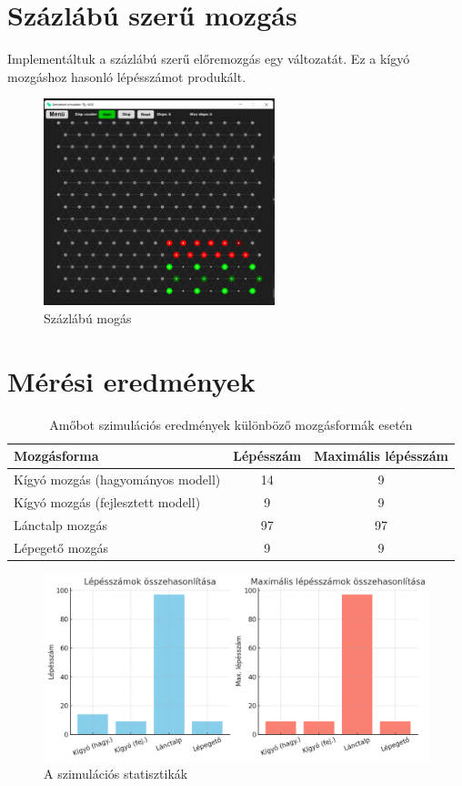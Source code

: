 \documentclass[	
  noindent
]{elteikthesis}[2024/04/26]
\begin{document}
  \section{Százlábú szerű mozgás}
    Implementáltuk a százlábú szerű előremozgás egy változatát. Ez a kígyó mozgáshoz hasonló lépésszámot produkált.
    \begin{figure}[H]
      \centering
      \includegraphics[width=0.6\textwidth]{images/mesurements/04_caterpillar.png}
      \caption{Százlábú mogás}
      \label{fig:04_caterpillar}
    \end{figure}

  \section{Mérési eredmények}
    \begin{table}[h!]
      \centering
      \begin{tabular}{|l|c|c|}
      \hline
      \textbf{Mozgásforma} & \textbf{Lépésszám} & \textbf{Maximális lépésszám} \\
      \hline
      Kígyó mozgás (hagyományos modell) & 14 & 9 \\
      Kígyó mozgás (fejlesztett modell) & 9 & 9 \\
      Lánctalp mozgás & 97 & 97 \\
      Lépegető mozgás & 9 & 9 \\
      \hline
      \end{tabular}
      \caption{Amőbot szimulációs eredmények különböző mozgásformák esetén}
      \label{tab:amobot_eredmenyek}
      \end{table}
  
      \begin{figure}[H]
        \centering
        \includegraphics[width=1.0\textwidth]{images/mesurements/stat.png}
        \caption{A szimulációs statisztikák}
        \label{fig:stat}
      \end{figure}
\end{document}
